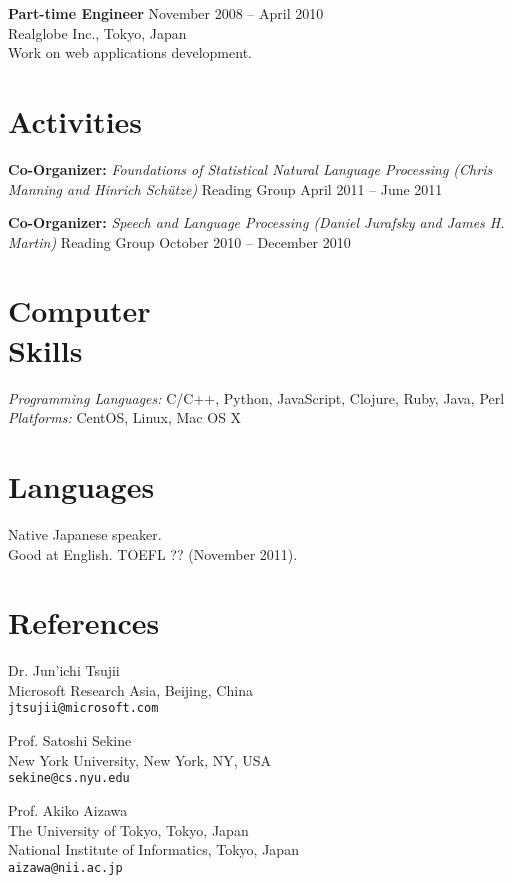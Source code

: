 \documentclass[margin]{res}
\begin{document}
\begin{resume}
\textbf{Part-time Engineer} \hfill November 2008 -- April 2010\\
Realglobe Inc., Tokyo, Japan\\
Work on web applications development.\\

\section{Activities}
\textbf{Co-Organizer:} {\sl Foundations of Statistical Natural Language Processing (Chris Manning and Hinrich Schütze)} Reading Group \hfill April 2011 -- June 2011

\textbf{Co-Organizer:} {\sl Speech and Language Processing (Daniel Jurafsky and James H. Martin)} Reading Group \hfill October 2010 -- December 2010\\


\section{Computer \\ Skills}
\textit{Programming Languages:} C/C++, Python, JavaScript, Clojure, Ruby, Java, Perl \\
\textit{Platforms:} CentOS, Linux, Mac OS X\\

\section{Languages}
Native Japanese speaker.\\
Good at English. TOEFL ?? (November 2011). \\

\section{References} 
Dr. Jun'ichi Tsujii \\
Microsoft Research Asia, Beijing, China\\
{\tt jtsujii@microsoft.com}

Prof. Satoshi Sekine \\
New York University, New York, NY, USA\\
{\tt sekine@cs.nyu.edu}

Prof. Akiko Aizawa \\
The University of Tokyo, Tokyo, Japan\\
National Institute of Informatics, Tokyo, Japan\\
{\tt aizawa@nii.ac.jp}

\end{resume}
\end{document}
